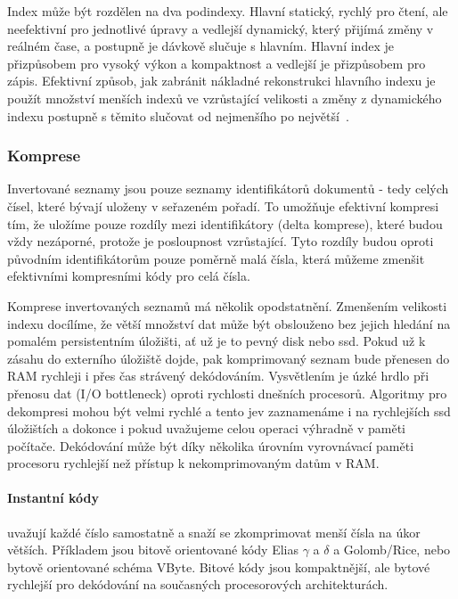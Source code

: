 \documentclass[11pt,letterpaper,oneside,openright]{book}
\begin{document}
Index může být rozdělen na dva podindexy. Hlavní statický, rychlý pro čtení,
ale neefektivní pro jednotlivé úpravy a vedlejší dynamický, který přijímá změny
v reálném čase, a postupně je dávkově slučuje s hlavním. Hlavní index je
přizpůsobem pro vysoký výkon a kompaktnost a vedlejší je přizpůsobem pro zápis.
Efektivní způsob, jak zabránit nákladné rekonstrukci hlavního indexu je použít
množství menších indexů ve vzrůstající velikosti a změny z dynamického indexu
postupně s těmito slučovat od nejmenšího po
největší~\citep[kap.~4]{Manning:2008:IIR:1394399}.

\subsubsection{Komprese} \label{sec:compression}
Invertované seznamy jsou pouze seznamy identifikátorů dokumentů - tedy celých
čísel, které bývají uloženy v seřazeném pořadí. To umožňuje efektivní kompresi
tím, že uložíme pouze rozdíly mezi identifikátory (delta komprese), které budou
vždy nezáporné, protože je posloupnost vzrůstající. Tyto rozdíly budou oproti
původním identifikátorům pouze poměrně malá čísla, která můžeme zmenšit
efektivními kompresními kódy pro celá čísla.

Komprese invertovaných seznamů má několik opodstatnění. Zmenšením velikosti
indexu docílíme, že větší množství dat může být obslouženo bez jejich hledání
na pomalém persistentním úložišti, ať už je to pevný disk nebo ssd. Pokud už k
zásahu do externího úložiště dojde, pak komprimovaný seznam bude přenesen do
RAM rychleji i přes čas strávený dekódováním. Vysvětlením je úzké hrdlo při
přenosu dat (I/O bottleneck) oproti rychlosti dnešních procesorů. Algoritmy pro
dekompresi mohou být velmi rychlé a tento jev zaznamenáme i na rychlejších ssd
úložištích a dokonce i pokud uvažujeme celou operaci výhradně v paměti
počítače. Dekódování může být díky několika úrovním vyrovnávací paměti
procesoru rychlejší než přístup k nekomprimovaným datům v RAM.

\paragraph{Instantní kódy} uvažují každé číslo samostatně a snaží se
zkomprimovat menší čísla na úkor větších. Příkladem jsou bitově orientované
kódy Elias $\gamma$ a $\delta$ a Golomb/Rice, nebo bytově orientované schéma
VByte. Bitové kódy jsou kompaktnější, ale bytové rychlejší pro dekódování na
současných procesorových architekturách.
\end{document}
